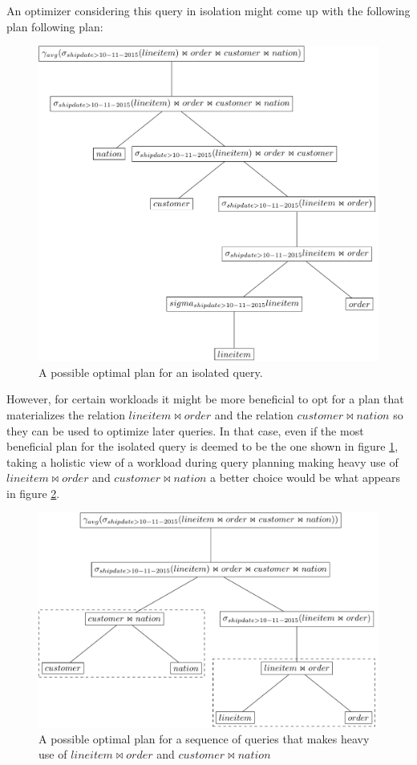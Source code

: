 An optimizer considering this query in isolation might come up with
the following plan following plan:

\begin{figure}[H]
  \centering
  \includegraphics[width=.9\linewidth]{./imgs/optplan.pdf}
  \caption{\label{fig:optplan}A possible optimal plan for an isolated
    query.}
\end{figure}

However, for certain workloads it might be more beneficial to opt for
a plan that materializes the relation \(lineitem \Join order\) and the
relation \(customer \Join nation\) so they can be used to optimize
later queries. In that case, even if the most beneficial plan for the
isolated query is deemed to be the one shown in figure \ref{fig:optplan},
taking a holistic view of a workload during query planning making
heavy use of \(lineitem \Join order\) and \(customer \Join nation\) a
better choice would be what appears in figure \ref{fig:workplan}.

\begin{figure}[H]
  \centering
  \includegraphics[width=.9\linewidth]{./imgs/workplan.pdf}
  \caption{\label{fig:workplan}A possible optimal plan for a sequence
    of queries that makes heavy use of \(lineitem \Join order\) and
    \(customer \Join nation\)}
\end{figure}

